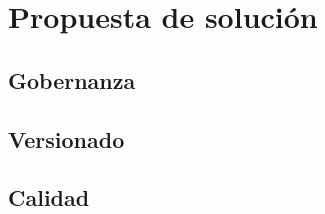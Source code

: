 \chapter{Propuesta de solución}
\label{capitulo4}

\section{Gobernanza}
\label{capitulo4:gobernanza}

\section{Versionado}
\label{capitulo4:versionado}

\section{Calidad}
\label{capitulo4:calidad}
